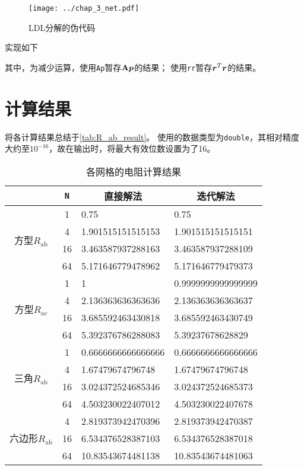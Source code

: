 \begin{figure}
    \centering
    \texttt{[image: ../chap\_3\_net.pdf]}
    \caption{LDL分解的伪代码}
    \label{fig:ldl}
\end{figure}

实现如下
{
    \linespread{1.0}
    
}
其中，为减少运算，使用\verb|Ap|暂存$\vb{A}\vb*{p}$的结果；
使用\verb|rr|暂存$\vb*{r}^T\vb*{r}$的结果。

\section{计算结果}
将各计算结果总结于\autoref{tab:R_ab_result}。
使用的数据类型为\texttt{double}，其相对精度大约至$10^{-16}$，故在输出时，将最大有效位数设置为了16。

\begin{table}
\centering
\caption{各网格的电阻计算结果}
\label{tab:R_ab_result}
\begin{tabular}{ccll}
    \toprule
    & \texttt{N} & \multicolumn{1}{c}{直接解法} & \multicolumn{1}{c}{迭代解法} \\
    \midrule
    \multirow{4}{*}{方型$R_\text{ab}$}   & 1          & 0.75                     & 0.75                     \\
     & 4  & 1.901515151515153 & 1.901515151515151 \\
     & 16 & 3.463587937288163 & 3.463587937288109 \\
     & 64 & 5.171646779478962 & 5.171646779479373 \\
    \hline
    \multirow{4}{*}{方型$R_\text{ac}$}   & 1          & 1                        & 0.9999999999999999       \\
     & 4  & 2.136363636363636 & 2.136363636363637 \\
     & 16 & 3.685592463430818 & 3.685592463430749 \\
     & 64 & 5.392376786288083 & 5.39237678628829  \\
    \hline
    \multirow{4}{*}{三角$R_\text{ab}$}  & 1          & 0.6666666666666666       & 0.6666666666666666       \\
     & 4  & 1.67479674796748  & 1.67479674796748  \\
     & 16 & 3.024372524685346 & 3.024372524685373 \\
     & 64 & 4.503230022407012 & 4.503230022407678 \\
    \hline
    \multirow{3}{*}{六边形$R_\text{ab}$} & 4          & 2.819373942470396        & 2.819373942470387        \\
     & 16 & 6.534376528387103 & 6.534376528387018 \\
     & 64 & 10.83543674481138 & 10.83543674481063 \\
    \bottomrule
\end{tabular}
\end{table}

